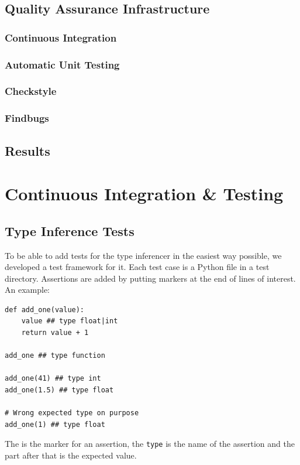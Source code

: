 \documentclass[12pt,halfparskip,DIV11,BCOR10mm]{scrreprt}
\begin{document}
\section{Quality Assurance Infrastructure}
\subsection{Continuous Integration}
\subsection{Automatic Unit Testing}
\subsection{Checkstyle}
\subsection{Findbugs}
\section{Results}

\chapter{Continuous Integration \& Testing}

\section{Type Inference Tests}


To be able to add tests for the type inferencer in the easiest way possible, we developed a test framework for it. Each test case is a Python file in a test directory. Assertions are added by putting markers at the end of lines of interest. An example:

\begin{lstlisting}
def add_one(value):
    value ## type float|int
    return value + 1

add_one ## type function

add_one(41) ## type int
add_one(1.5) ## type float

# Wrong expected type on purpose
add_one(1) ## type float
\end{lstlisting}

The \code{##} is the marker for an assertion, the \texttt{type} is the name of the assertion and the part after that is the expected value.
\end{document}
